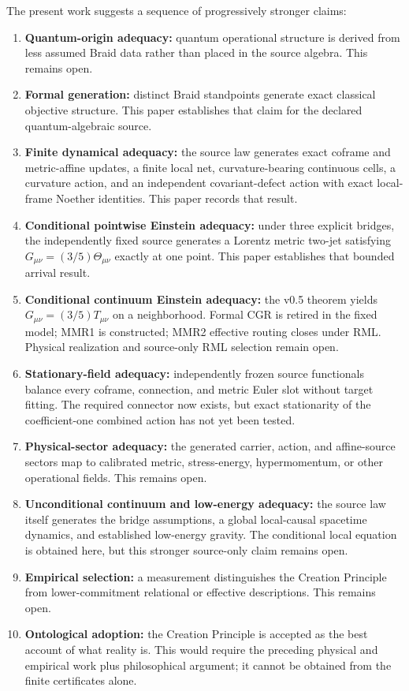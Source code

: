 \documentclass[11pt]{article}
\theoremstyle{definition}
\theoremstyle{remark}
\begin{document}
The present work suggests a sequence of progressively stronger claims:
\begin{enumerate}
\item \textbf{Quantum-origin adequacy:} quantum operational structure is derived from less assumed Braid data rather than placed in the source algebra. This remains open.
\item \textbf{Formal generation:} distinct Braid standpoints generate exact classical objective structure. This paper establishes that claim for the declared quantum-algebraic source.
\item \textbf{Finite dynamical adequacy:} the source law generates exact coframe and metric-affine updates, a finite local net, curvature-bearing continuous cells, a curvature action, and an independent covariant-defect action with exact local-frame Noether identities. This paper records that result.
\item \textbf{Conditional pointwise Einstein adequacy:} under three explicit bridges, the independently fixed source generates a Lorentz metric two-jet satisfying $G_{\mu\nu}=(3/5)\Theta_{\mu\nu}$ exactly at one point. This paper establishes that bounded arrival result.
\item \textbf{Conditional continuum Einstein adequacy:} the v0.5 theorem yields $G_{\mu\nu}=(3/5)T_{\mu\nu}$ on a neighborhood. Formal CGR is retired in the fixed model; MMR1 is constructed; MMR2 effective routing closes under RML. Physical realization and source-only RML selection remain open.
\item \textbf{Stationary-field adequacy:} independently frozen source functionals balance every coframe, connection, and metric Euler slot without target fitting. The required connector now exists, but exact stationarity of the coefficient-one combined action has not yet been tested.
\item \textbf{Physical-sector adequacy:} the generated carrier, action, and affine-source sectors map to calibrated metric, stress-energy, hypermomentum, or other operational fields. This remains open.
\item \textbf{Unconditional continuum and low-energy adequacy:} the source law itself generates the bridge assumptions, a global local-causal spacetime dynamics, and established low-energy gravity. The conditional local equation is obtained here, but this stronger source-only claim remains open.
\item \textbf{Empirical selection:} a measurement distinguishes the Creation Principle from lower-commitment relational or effective descriptions. This remains open.
\item \textbf{Ontological adoption:} the Creation Principle is accepted as the best account of what reality is. This would require the preceding physical and empirical work plus philosophical argument; it cannot be obtained from the finite certificates alone.
\end{enumerate}
\end{document}
